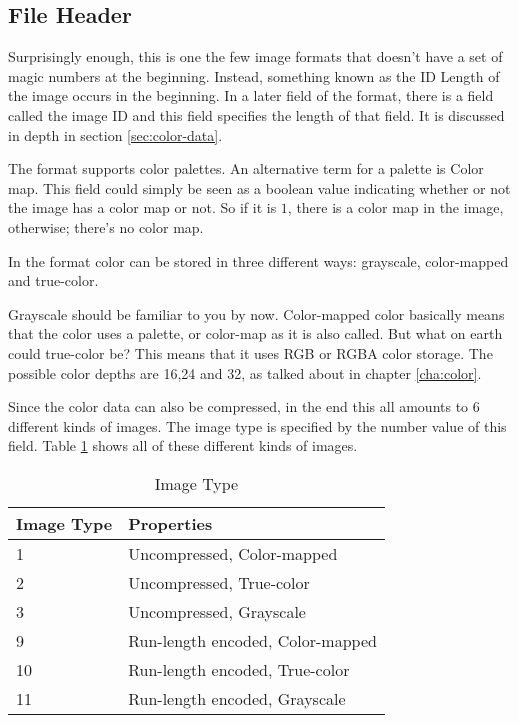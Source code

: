\begin{refsection}
  \section{File Header}


  Surprisingly enough, this is one the few image formats that doesn't
  have a set of magic numbers at the beginning. Instead, something
  known as the ID Length of the image occurs in the beginning. In a
  later field of the format, there is a field called the image
  ID and this field specifies the length of that field. It is discussed
  in depth in section \ref{sec:color-data}.


  The \tga format supports color palettes. An alternative term for a
  palette is Color map. This field could simply be
  seen as a boolean value indicating whether or not the image has a color
  map or not. So if it is $1$, there is a color map in the
  image, otherwise; there's no color map.


  In the \tga format color can be stored in three different ways:
  grayscale, color-mapped and
  true-color.

  Grayscale should be familiar to you by now. Color-mapped color
  basically means that the color uses a palette, or color-map as it is
  also called. But what on earth could true-color be? This means that
  it uses RGB or RGBA color storage. The possible color depths are
  16,24 and 32, as talked about in chapter \ref{cha:color}.

  Since the color data can also be compressed, in the end this all
  amounts to $6$ different kinds of images. The image type is
  specified by the number value of this field. Table \ref{tab:imgtype}
  shows all of these different kinds of images.

  \begin{table}
    \centering
    \begin{tabular}{ll}
      \toprule
      Image Type & Properties \\
      \midrule
      1 & Uncompressed, Color-mapped \\
      2 & Uncompressed, True-color \\
      3 & Uncompressed, Grayscale\\
      9 & Run-length encoded, Color-mapped \\
      10 & Run-length encoded, True-color \\
      11 & Run-length encoded, Grayscale\\
      \bottomrule
    \end{tabular}
    \caption{Image Type}
    \label{tab:imgtype}
  \end{table}


\end{refsection}
